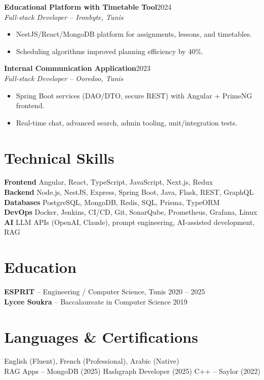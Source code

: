 \documentclass[10pt,a4paper]{article}
\newcommand{\role}[3]{%
  \textbf{#1}\hfill{\color{muted}\small #3}\\
  {\color{muted}\small\itshape #2}\par}
\begin{document}
\vspace{5pt}
\role{Educational Platform with Timetable Tool}{Full-stack Developer -- Ironbyte, Tunis}{2024}
\begin{itemize}[leftmargin=12pt,itemsep=1pt,topsep=3pt,parsep=0pt]
  \item NestJS/React/MongoDB platform for assignments, lessons, and timetables.
  \item Scheduling algorithms improved planning efficiency by 40\%.
\end{itemize}

\vspace{5pt}
\role{Internal Communication Application}{Full-stack Developer -- Ooredoo, Tunis}{2023}
\begin{itemize}[leftmargin=12pt,itemsep=1pt,topsep=3pt,parsep=0pt]
  \item Spring Boot services (DAO/DTO, secure REST) with Angular + PrimeNG frontend.
  \item Real-time chat, advanced search, admin tooling, unit/integration tests.
\end{itemize}

\section*{Technical Skills}
\small
\textbf{Frontend} \enspace Angular, React, TypeScript, JavaScript, Next.js, Redux\\[2pt]
\textbf{Backend} \enspace Node.js, NestJS, Express, Spring Boot, Java, Flask, REST, GraphQL\\[2pt]
\textbf{Databases} \enspace PostgreSQL, MongoDB, Redis, SQL, Prisma, TypeORM\\[2pt]
\textbf{DevOps} \enspace Docker, Jenkins, CI/CD, Git, SonarQube, Prometheus, Grafana, Linux\\[2pt]
\textbf{AI} \enspace LLM APIs (OpenAI, Claude), prompt engineering, AI-assisted development, RAG

\section*{Education}
\small
\textbf{ESPRIT} -- Engineering / Computer Science, Tunis \hfill {\color{muted}2020 -- 2025}\\[2pt]
\textbf{Lycee Soukra} -- Baccalaureate in Computer Science \hfill {\color{muted}2019}

\section*{Languages \& Certifications}
\small
English (Fluent), French (Professional), Arabic (Native)\\[2pt]
RAG Apps -- MongoDB (2025) \quad Hashgraph Developer (2025) \quad C++ -- Saylor (2022)
\end{document}
